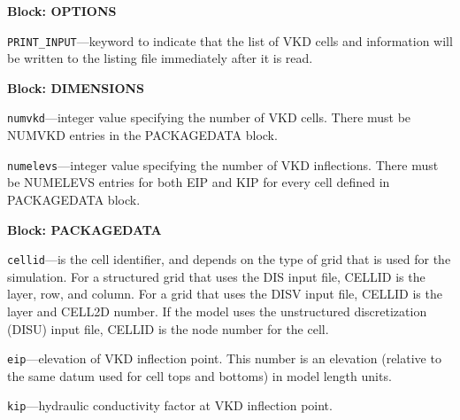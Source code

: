 
\item \textbf{Block: OPTIONS}

\begin{description}
\item \texttt{PRINT\_INPUT}---keyword to indicate that the list of VKD cells and information will be written to the listing file immediately after it is read.

\end{description}
\item \textbf{Block: DIMENSIONS}

\begin{description}
\item \texttt{numvkd}---integer value specifying the number of VKD cells. There must be NUMVKD entries in the PACKAGEDATA block.

\item \texttt{numelevs}---integer value specifying the number of VKD inflections. There must be NUMELEVS entries for both EIP and KIP for every cell defined in PACKAGEDATA block.

\end{description}
\item \textbf{Block: PACKAGEDATA}

\begin{description}
\item \texttt{cellid}---is the cell identifier, and depends on the type of grid that is used for the simulation.  For a structured grid that uses the DIS input file, CELLID is the layer, row, and column.   For a grid that uses the DISV input file, CELLID is the layer and CELL2D number.  If the model uses the unstructured discretization (DISU) input file, CELLID is the node number for the cell.

\item \texttt{eip}---elevation of VKD inflection point.  This number is an elevation (relative to the same datum used for cell tops and bottoms) in model length units.

\item \texttt{kip}---hydraulic conductivity factor at VKD inflection point.

\end{description}

